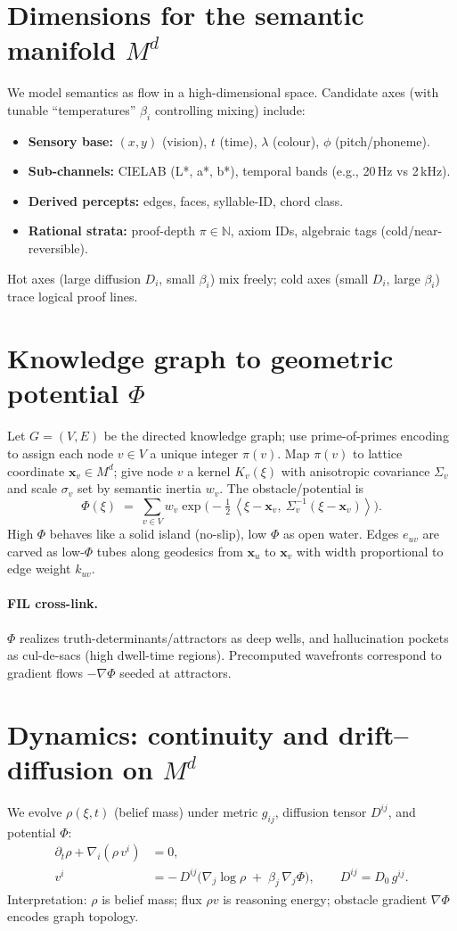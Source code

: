 \documentclass[11pt]{article}
\newcommand{\manifold}{M^d}
\newcommand{\bv}[1]{\boldsymbol{#1}}
\newcommand{\ang}[1]{\left\langle #1 \right\rangle}
\begin{document}
\section{Dimensions for the semantic manifold $\manifold$}
We model semantics as flow in a high-dimensional space. Candidate axes (with tunable ``temperatures'' $\beta_i$ controlling mixing) include:
\begin{itemize}[leftmargin=2em]
  \item \textbf{Sensory base:} $(x,y)$ (vision), $t$ (time), $\lambda$ (colour), $\phi$ (pitch/phoneme).
  \item \textbf{Sub-channels:} CIELAB (L*, a*, b*), temporal bands (e.g., 20\,Hz vs 2\,kHz).
  \item \textbf{Derived percepts:} edges, faces, syllable-ID, chord class.
  \item \textbf{Rational strata:} proof-depth $\pi\in\mathbb{N}$, axiom IDs, algebraic tags (cold/near-reversible).
\end{itemize}
Hot axes (large diffusion $D_i$, small $\beta_i$) mix freely; cold axes (small $D_i$, large $\beta_i$) trace logical proof lines.
\section{Knowledge graph to geometric potential $\Phi$}
Let $G=(V,E)$ be the directed knowledge graph; use prime-of-primes encoding to assign each node $v\in V$ a unique integer $\pi(v)$. Map $\pi(v)$ to lattice coordinate $\bv{x}_v\in \manifold$; give node $v$ a kernel $K_v(\xi)$ with anisotropic covariance $\Sigma_v$ and scale $\sigma_v$ set by semantic inertia $w_v$. The obstacle/potential is
\begin{equation}
\Phi(\xi) \;=\; \sum_{v\in V} w_v \exp\!\Big(-\tfrac{1}{2}\,\ang{\xi-\bv{x}_v,\ \Sigma_v^{-1}(\xi-\bv{x}_v)}\Big).
\end{equation}
High $\Phi$ behaves like a solid island (no-slip), low $\Phi$ as open water. Edges $e_{uv}$ are carved as low-$\Phi$ tubes along geodesics from $\bv{x}_u$ to $\bv{x}_v$ with width proportional to edge weight $k_{uv}$.
\paragraph{FIL cross-link.} $\Phi$ realizes truth-determinants/attractors as deep wells, and hallucination pockets as cul-de-sacs (high dwell-time regions). Precomputed wavefronts correspond to gradient flows $-\nabla\Phi$ seeded at attractors.
\section{Dynamics: continuity and drift--diffusion on $\manifold$}
We evolve $\rho(\xi,t)$ (belief mass) under metric $g_{ij}$, diffusion tensor $D^{ij}$, and potential $\Phi$:
\begin{align}
\partial_t \rho + \nabla_i(\rho\,v^i)&=0,\\
v^i &= -\,D^{ij}\Big(\nabla_j \log \rho \;+\; \beta_j\,\nabla_j \Phi\Big), \qquad D^{ij}=D_0\,g^{ij}.
\end{align}
Interpretation: $\rho$ is belief mass; flux $\rho v$ is reasoning energy; obstacle gradient $\nabla\Phi$ encodes graph topology.
\end{document}
